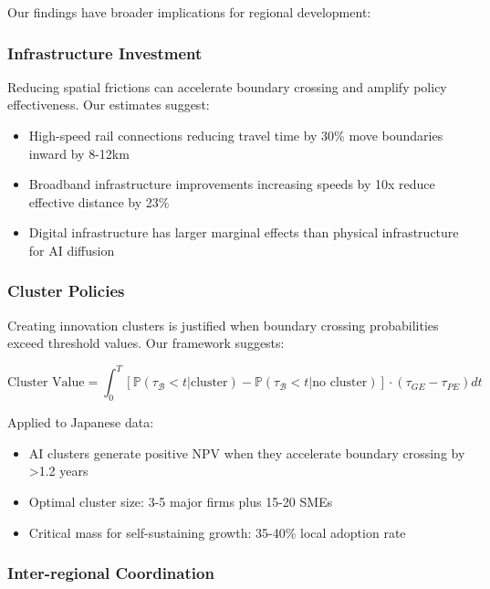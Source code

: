 Our findings have broader implications for regional development:

\subsubsection{Infrastructure Investment}

Reducing spatial frictions can accelerate boundary crossing and amplify policy effectiveness. Our estimates suggest:

\begin{itemize}
   \item High-speed rail connections reducing travel time by 30\% move boundaries inward by 8-12km
   \item Broadband infrastructure improvements increasing speeds by 10x reduce effective distance by 23\%
   \item Digital infrastructure has larger marginal effects than physical infrastructure for AI diffusion
\end{itemize}

\subsubsection{Cluster Policies}

Creating innovation clusters is justified when boundary crossing probabilities exceed threshold values. Our framework suggests:

\begin{equation}
\text{Cluster Value} = \int_0^T \left[\mathbb{P}(\tau_\mathcal{B} < t | \text{cluster}) - \mathbb{P}(\tau_\mathcal{B} < t | \text{no cluster})\right] \cdot (\tau_{GE} - \tau_{PE}) dt
\end{equation}

Applied to Japanese data:
\begin{itemize}
   \item AI clusters generate positive NPV when they accelerate boundary crossing by >1.2 years
   \item Optimal cluster size: 3-5 major firms plus 15-20 SMEs
   \item Critical mass for self-sustaining growth: 35-40\% local adoption rate
\end{itemize}

\subsubsection{Inter-regional Coordination}

